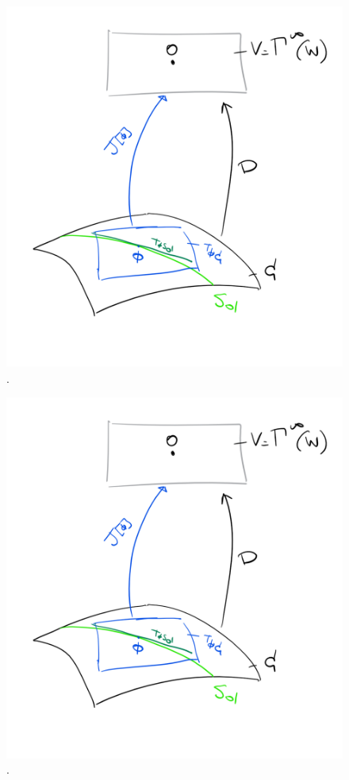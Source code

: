 \documentclass[a4paper,12pt]{scrartcl}  %
\begin{document}
\begin{figure}
  \centering
  \includegraphics{Pictures/jacobi.png}
  \caption{.}
\end{figure}

\begin{figure}
  \centering
  \includegraphics{Pictures/jacobi.png}
  \caption{.}
\end{figure}
\end{document}

